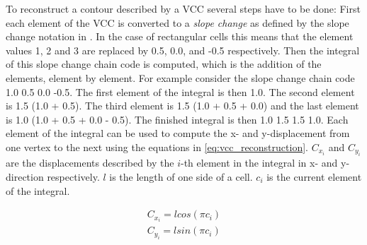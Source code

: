 \documentclass[thesis.tex]{subfiles}
\begin{document}
To reconstruct a contour described by a VCC several steps have to be done: First each element of the VCC is converted to a \textit{slope change} as defined by the slope change notation in \cite{slope_change_notation}. In the case of rectangular cells this means that the element values 1, 2 and 3 are replaced by 0.5, 0.0, and -0.5 respectively. Then the integral of this slope change chain code is computed, which is the addition of the elements, element by element. For example consider the slope change chain code 1.0 0.5 0.0 -0.5. The first element of the integral is then 1.0. The second element is 1.5 (1.0 + 0.5). The third element is 1.5 (1.0 + 0.5 + 0.0) and the last element is 1.0 (1.0 + 0.5 + 0.0 - 0.5). The finished integral is then 1.0 1.5 1.5 1.0. Each element of the integral can be used to compute the x- and y-displacement from one vertex to the next using the equations in \ref{eq:vcc_reconstruction}. $C_{x_i}$ and $C_{y_i}$ are the displacements described by the $i$-th element in the integral in x- and y-direction respectively. $l$ is the length of one side of a cell. $c_i$ is the current element of the integral. 

\begin{equation} \label{eq:vcc_reconstruction}
\begin{split} 
C_{x_i} = l  cos(\pi c_i) \\
C_{y_i} = l  sin(\pi c_i) \\
\end{split}
\end{equation}



\subfilebib %
\end{document}
